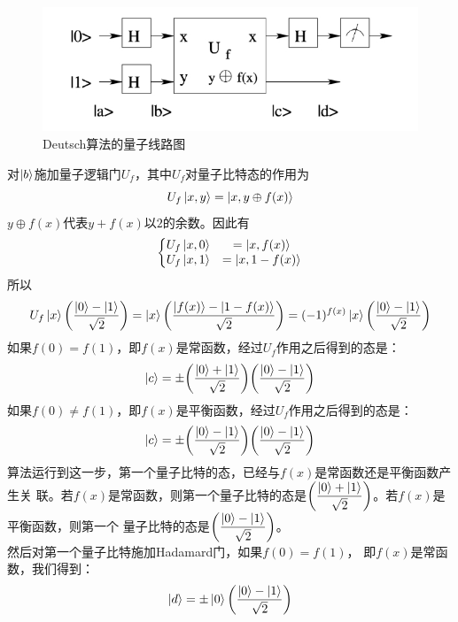 \documentclass[a4paper]{article}
\begin{document}
\begin{figure}[H]
	\centering
	\includegraphics[width=0.8\linewidth]{fig/deutsch2.jpg}
	\caption{Deutsch算法的量子线路图}
	\label{fig:deutsch2}
\end{figure}
对$ \ket{b} $施加量子逻辑门$ U_f $，其中$ U_f $对量子比特态的作用为
\begin{equation}\label{key}
U_f\ket{x,y} = \ket{x,y\oplus f(x)}
\end{equation}
$ y\oplus f(x) $代表$ y+f(x) $以$ 2  $的余数。因此有
\begin{equation}\label{key}
\left\{\mqty{
	U_f\ket{x,0} &= \ket{x, f(x)}\\
	U_f\ket{x,1} &= \ket{x, 1-f(x)}
}\right.	
\end{equation}
所以
\begin{equation}\label{key}
U_f\ket{x} \qty(\dfrac{\ket{0} - \ket{1}}{\sqrt{2}}) = \ket{x} \qty(\dfrac{\ket{f(x)} - \ket{1-f(x)}}{\sqrt{2}}) = (-1)^{f(x)} \ket{x} \qty(\dfrac{\ket{0} - \ket{1}}{\sqrt{2}})
\end{equation}
如果$ f(0) =f(1) $，即$ f(x)  $是常函数，经过$ U_f $作用之后得到的态是：
\begin{equation}\label{key}
\ket{c} = \pm \qty(\dfrac{\ket{0} + \ket{1}}{\sqrt{2}})\qty(\dfrac{\ket{0} - \ket{1}}{\sqrt{2}})
\end{equation}
如果$ f(0) \neq f(1) $，即$ f(x)  $是平衡函数，经过$ U_f $作用之后得到的态是：
\begin{equation}\label{key}
\ket{c} = \pm \qty(\dfrac{\ket{0} - \ket{1}}{\sqrt{2}})\qty(\dfrac{\ket{0} - \ket{1}}{\sqrt{2}})
\end{equation}
算法运行到这一步，第一个量子比特的态，已经与$ f(x)  $是常函数还是平衡函数产生关
联。若$ f(x) $是常函数，则第一个量子比特的态是$ \qty(\dfrac{\ket{0} + \ket{1}}{\sqrt{2}}) $。若$ f(x)  $是平衡函数，则第一个
量子比特的态是$ \qty(\dfrac{\ket{0} - \ket{1}}{\sqrt{2}}) $。\\
然后对第一个量子比特施加Hadamard门，如果$ f(0) = f(1) $，
即$ f(x)  $是常函数，我们得到：
\begin{equation}\label{key}
\ket{d} = \pm\ket{0}\qty(\dfrac{\ket{0} - \ket{1}}{\sqrt{2}})
\end{equation}
\end{document}
